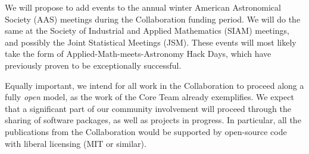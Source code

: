 \documentclass[12pt]{article}
\begin{document}

We will propose to add events to the annual winter American Astronomical
Society (AAS) meetings during the Collaboration funding period.
We will do the same at the Society of Industrial and Applied Mathematics
(SIAM) meetings, and possibly the Joint Statistical Meetings (JSM).
These events will most likely take the form of
Applied-Math-meets-Astronomy Hack Days, which have previously proven to
be exceptionally successful.

Equally important, we intend for all work in the Collaboration to
proceed along a fully {\em open} model, as the work of the Core Team
already exemplifies.
We expect that a significant part of our community involvement will
proceed through the sharing of software packages, as well as projects in
progress.
In particular, all the publications from the Collaboration would be
supported by open-source code with liberal licensing (MIT or similar).
\end{document}
